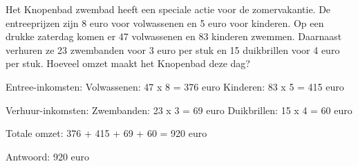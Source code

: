 \begin{opgave}
Het Knopenbad zwembad heeft een speciale actie voor de zomervakantie. De 
entreeprijzen zijn 8 euro voor volwassenen en 5 euro voor kinderen. Op een 
drukke zaterdag komen er 47 volwassenen en 83 kinderen zwemmen. Daarnaast 
verhuren ze 23 zwembanden voor 3 euro per stuk en 15 duikbrillen voor 4 euro 
per stuk. Hoeveel omzet maakt het Knopenbad deze dag?
\end{opgave}

\begin{oplossing}
Entree-inkomsten:
Volwassenen: 47 x 8 = 376 euro
Kinderen: 83 x 5 = 415 euro

Verhuur-inkomsten:
Zwembanden: 23 x 3 = 69 euro
Duikbrillen: 15 x 4 = 60 euro

Totale omzet:
376 + 415 + 69 + 60 = 920 euro

Antwoord: 920 euro
\end{oplossing}